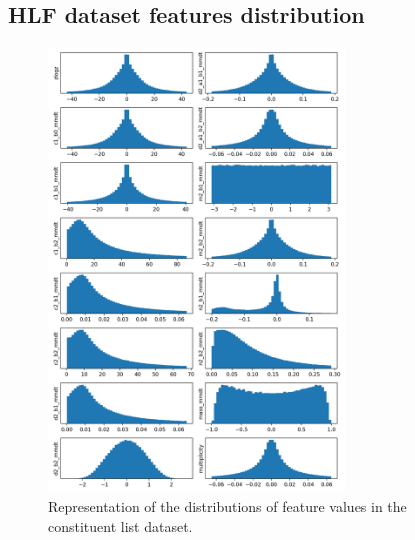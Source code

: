 \begin{appendices}
\chapter{HLF dataset features distribution}
\begin{figure}[hpt!]
  \centering
  \includegraphics[trim={0cm 0cm 0cm 0cm}, width=0.7\textwidth, center]{../logs/constituent_distribution.png}
  \caption{Representation of the distributions of feature values in the constituent list dataset.}
  \label{fig:distributions-constituent}
\end{figure}

\end{appendices}
